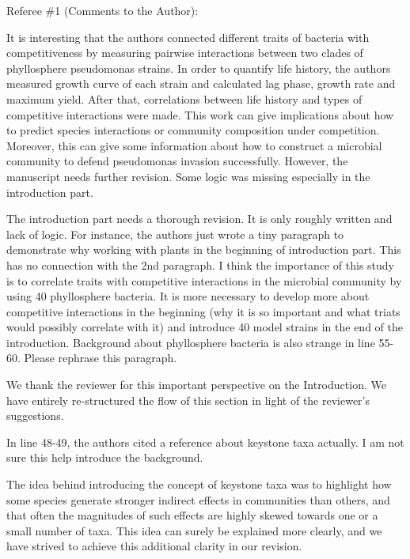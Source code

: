 \documentclass[11pt,]{article}
\begin{document}
\begin{blockquote}
Referee \#1 (Comments to the Author):

It is interesting that the authors connected different traits of
bacteria with competitiveness by measuring pairwise interactions between
two clades of phyllosphere pseudomonas strains. In order to quantify
life history, the authors measured growth curve of each strain and
calculated lag phase, growth rate and maximum yield. After that,
correlations between life history and types of competitive interactions
were made. This work can give implications about how to predict species
interactions or community composition under competition. Moreover, this
can give some information about how to construct a microbial community
to defend pseudomonas invasion successfully. However, the manuscript
needs further revision. Some logic was missing especially in the
introduction part.

The introduction part needs a thorough revision. It is only roughly
written and lack of logic. For instance, the authors just wrote a tiny
paragraph to demonstrate why working with plants in the beginning of
introduction part. This has no connection with the 2nd paragraph. I
think the importance of this study is to correlate traits with
competitive interactions in the microbial community by using 40
phyllosphere bacteria. It is more necessary to develop more about
competitive interactions in the beginning (why it is so important and
what triats would possibly correlate with it) and introduce 40 model
strains in the end of the introduction. Background about phyllosphere
bacteria is also strange in line 55-60. Please rephrase this paragraph.
\end{blockquote}

We thank the reviewer for this important perspective on the
Introduction. We have entirely re-structured the flow of this section in
light of the reviewer's suggestions.

\begin{blockquote}
In line 48-49, the authors cited a reference about keystone taxa
actually. I am not sure this help introduce the background.
\end{blockquote}

The idea behind introducing the concept of keystone taxa was to
highlight how some species generate stronger indirect effects in
communities than others, and that often the magnitudes of such effects
are highly skewed towards one or a small number of taxa. This idea can
surely be explained more clearly, and we have strived to achieve this
additional clarity in our revision.
\end{document}
